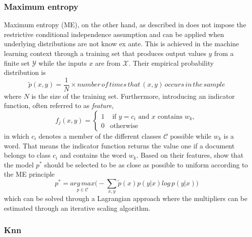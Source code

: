 \subsubsection{Maximum entropy} %
Maximum entropy (ME), on the other hand, as described in \textcite{Berger.1996} does not impose the restrictive conditional independence assumption and can be applied when underlying distributions are not know ex ante. 
This is achieved in the machine learning context through a training set that produces output values $y$ from a finite set $\mathcal{Y}$ while the inputs $x$ are from $\mathcal{X}$. Their empirical probability distribution is
%
\begin{equation*}
	\tilde{p}(x,y) = \frac{1}{N}\times number\, of\, times\, that\, (x,y)\, occurs\, in\, the\, sample
\end{equation*}
%
where $N$ is the size of the training set. Furthermore, introducing an indicator function, often referred to as \textit{feature},
%
\begin{equation*}
	f_j(x,y) = 
				\begin{cases}
					1 &\text{ if } y = c_i \text{ and $x$ contains $w_k$},\\
					0 & \text{otherwise }
				\end{cases}
\end{equation*}
%
in which $c_i$ denotes a member of the different classes $\mathcal{C}$ possible while $w_k$ is a word. That means the indicator function returns the value one if a document belongs to class $c_i$ and contains the word $w_k$. Based on their features, \textcite{Berger.1996} show that the model $p^*$ should be selected to be as close as possible to uniform according to the ME principle
%
\begin{equation}
	p^* = \underset{p\in \mathcal{C}}{arg\, max} \big(-\sum_{x,y}\tilde{p}(x)p(y|x)log\, p(y|x)\big)
\end{equation}
%
which can be solved through a Lagrangian approach where the multipliers can be estimated through an iterative scaling algorithm.

%
\subsubsection{Knn} %

